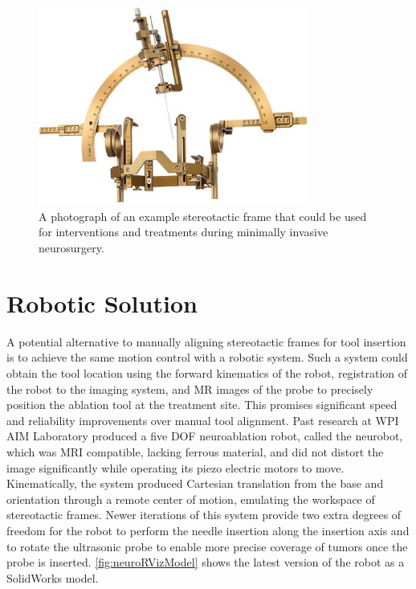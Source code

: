 \documentclass[12pt]{report}
\begin{document}
\begin{figure}[thpb]
	\centering
	\includegraphics[width = 3.5in]{images/stereo_tactic_frame.jpg}
    \caption{A photograph of an example stereotactic frame that could be used for interventions and treatments during minimally invasive neurosurgery. \cite{stereotactic}}
    \label{fig:stereotactic}
\end{figure}


\section{Robotic Solution}
A potential alternative to manually aligning stereotactic frames for tool insertion is to achieve the same motion control with a robotic system. Such a system could obtain the tool location using the forward kinematics of the robot, registration of the robot to the imaging system, and MR images of the probe to precisely position the ablation tool at the treatment site. This promises significant speed and reliability improvements over manual tool alignment. Past research at WPI AIM Laboratory produced a five DOF neuroablation robot, called the neurobot, which was MRI compatible, lacking ferrous material, and did not distort the image significantly while operating its piezo electric motors to move. \cite{aimLabRobot} Kinematically, the system produced Cartesian translation from the base and orientation through a remote center of motion, emulating the workspace of stereotactic frames. Newer iterations of this system provide two extra degrees of freedom for the robot to perform the needle insertion along the insertion axis and to rotate the ultrasonic probe to enable more precise coverage of tumors once the probe is inserted. \cite{neurobotIros} \autoref{fig:neuroRVizModel} shows the latest version of the robot as a SolidWorks model.
\end{document}
